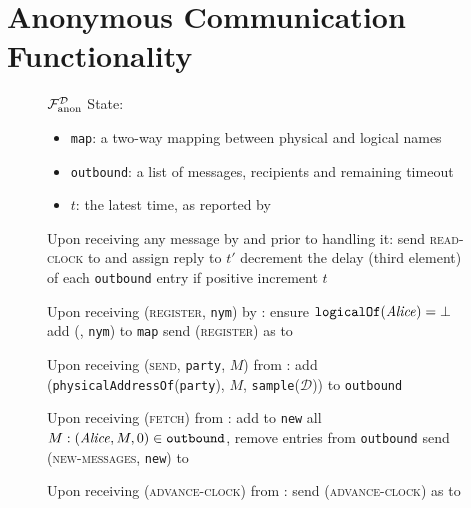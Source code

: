 \section{Anonymous Communication Functionality}
  \label{sec:fanon}
  \begin{figure}[H]
    \begin{systembox}{$\mathcal{F}_{\mathrm{anon}}^{\mathcal{D}}$} 
      State:
      \begin{itemize}
        \item \texttt{map}: a two-way mapping between physical and logical names
        \item \texttt{outbound}: a list of messages, recipients and remaining
        timeout
        \item $t$: the latest time, as reported by \gFclock
      \end{itemize}
      \begin{algorithmic}[1]
        \State Upon receiving any message by \alice{} and prior to handling it:
        \Indent
          \State send \textsc{read-clock} to \gFclock and assign reply to $t'$
            \State decrement the delay (third element) of each \texttt{outbound}
            entry if positive
            \State increment $t$
          \EndIf
        \EndIndent
        \Statex

        \State Upon receiving (\textsc{register}, \texttt{nym}) by \alice:
        \Indent
          \State ensure $\mathtt{logicalOf}(\mathit{Alice}) = \bot$
          \State add (\alice, \texttt{nym}) to \texttt{map}
          \State send (\textsc{register}) as \alice{} to \gFclock
        \EndIndent
        \Statex

        \State Upon receiving (\textsc{send}, \texttt{party}, $M$) from \alice:
        \Indent
          \State add (\texttt{physicalAddressOf}(\texttt{party}), $M$,
          \texttt{sample}($\mathcal{D}$)) to \texttt{outbound} 
        \EndIndent
        \Statex

        \State Upon receiving (\textsc{fetch}) from \alice:
        \Indent
          \State add to \texttt{new} all $M: (\mathit{Alice}, M, 0) \in
          \mathtt{outbound}$, remove entries from \texttt{outbound}
          \State send (\textsc{new-messages}, \texttt{new}) to \alice
        \EndIndent
        \Statex

        \State Upon receiving (\textsc{advance-clock}) from \alice:
        \Indent
          \State send (\textsc{advance-clock}) as \alice{} to \gFclock
        \EndIndent
      \end{algorithmic}
    \end{systembox}
    \caption{}
    \label{alg:fanon}
  \end{figure}
